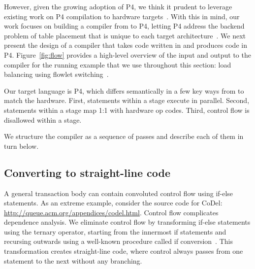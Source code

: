 However, given the growing adoption of P4, we think it prudent to leverage
existing work on P4 compilation to hardware targets~\cite{netronome, xilinx}.
With this in mind, our work focuses on building a compiler from \pktlanguage to
P4, letting P4 address the backend problem of table placement that is unique to
each target architecture~\cite{lavanya_compiler}.
We next present the design of a compiler that takes code written in
\pktlanguage{} and produces code in P4. Figure~\ref{fig:flow} provides a
high-level overview of the input and output to the compiler for the running
example that we use throughout this section: load balancing using flowlet
switching~\cite{flowlets}.

Our target language is P4, which differs semantically in a few key ways from
\pktlanguage{} to match the hardware. First, statements within a stage execute
in parallel. Second, statements within a stage map 1:1 with hardware op codes.
Third, control flow is disallowed within a stage.

We structure the compiler as a sequence of passes and describe each of them in
turn below. 


\subsection{Converting to straight-line code}
A general transaction body can contain convoluted control flow using if-else
statements. As an extreme example, consider the source code for CoDel:
\url{http://queue.acm.org/appendices/codel.html}. Control flow complicates
dependence analysis. We eliminate control flow by transforming if-else
statements using the ternary operator, starting from the innermost if
statements and recursing outwards using a well-known procedure called if
conversion~\cite{allen_if_conversion}.  This transformation creates
straight-line code, where control always passes from one statement to the next
without any branching.

